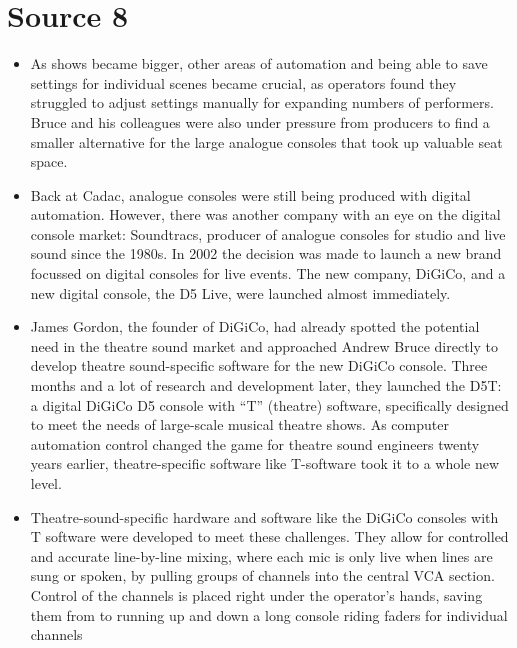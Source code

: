 \documentclass[12pt]{article}
\begin{document}
    \section{Source 8 \autocite{gillmoreBriefHistoryTheatre2016}}
        \begin{itemize}
            \item As shows became bigger, other areas of automation and being able to save settings for individual scenes became crucial, as operators found they struggled to adjust settings manually for expanding numbers of performers. Bruce and his colleagues were also under pressure from producers to find a smaller alternative for the large analogue consoles that took up valuable seat space.
            \item Back at Cadac, analogue consoles were still being produced with digital automation. However, there was another company with an eye on the digital console market: Soundtracs, producer of analogue consoles for studio and live sound since the 1980s. In 2002 the decision was made to launch a new brand focussed on digital consoles for live events. The new company, DiGiCo, and a new digital console, the D5 Live, were launched almost immediately.
            \item James Gordon, the founder of DiGiCo, had already spotted the potential need in the theatre sound market and approached Andrew Bruce directly to develop theatre sound-specific software for the new DiGiCo console. Three months and a lot of research and development later, they launched the D5T\@: a digital DiGiCo D5 console with ``T'' (theatre) software, specifically designed to meet the needs of large-scale musical theatre shows. As computer automation control changed the game for theatre sound engineers twenty years earlier, theatre-specific software like T-software took it to a whole new level.
            \item Theatre-sound-specific hardware and software like the DiGiCo consoles with T software were developed to meet these challenges. They allow for controlled and accurate line-by-line mixing, where each mic is only live when lines are sung or spoken, by pulling groups of channels into the central VCA section. Control of the channels is placed right under the operator's hands, saving them from to running up and down a long console riding faders for individual channels
        \end{itemize}
    \newpage
\end{document}
